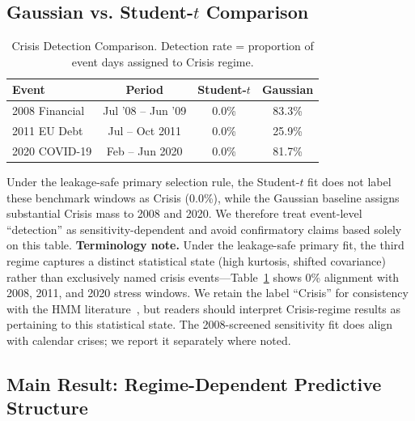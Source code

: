 \documentclass[sigconf,anonymous]{acmart}
\begin{document}
\subsection{Gaussian vs. Student-\texorpdfstring{$t$}{t} Comparison}
\label{sec:gaussian_comparison}

\begin{table}[t]
\centering
\caption{Crisis Detection Comparison. Detection rate = proportion of event days
assigned to Crisis regime.}
\label{tab:detection}
\small
\begin{tabular}{lccc}
\toprule
Event & Period & Student-$t$ & Gaussian \\
\midrule
2008 Financial & Jul '08 -- Jun '09 & 0.0\% & 83.3\% \\
2011 EU Debt & Jul -- Oct 2011 & 0.0\% & 25.9\% \\
2020 COVID-19 & Feb -- Jun 2020 & 0.0\% & 81.7\% \\
\bottomrule
\end{tabular}
\end{table}

Under the leakage-safe primary selection rule, the Student-$t$ fit does not
label these benchmark windows as Crisis (0.0\%), while the Gaussian baseline
assigns substantial Crisis mass to 2008 and 2020. We therefore treat event-level
``detection'' as sensitivity-dependent and avoid confirmatory claims based solely
on this table.
\textbf{Terminology note.} Under the leakage-safe primary fit, the third regime
captures a distinct statistical state (high kurtosis, shifted covariance) rather
than exclusively named crisis events---Table~\ref{tab:detection} shows 0\% alignment
with 2008, 2011, and 2020 stress windows. We retain the label ``Crisis'' for
consistency with the HMM literature~\cite{bulla2011hidden}, but readers should
interpret Crisis-regime results as pertaining to this statistical state. The
2008-screened sensitivity fit does align with calendar crises; we report it
separately where noted.

\subsection{Main Result: Regime-Dependent Predictive Structure}
\label{sec:main_result}
\end{document}
